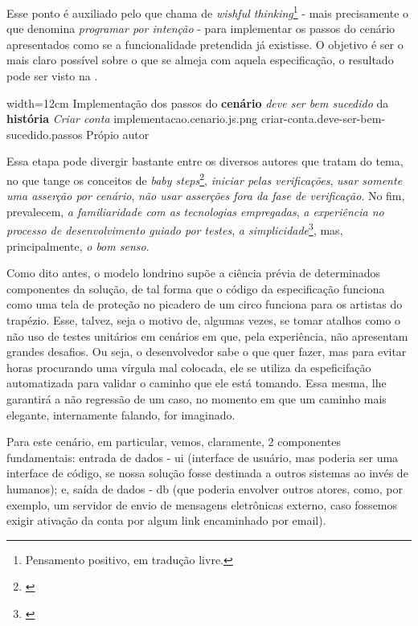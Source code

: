   Esse ponto é auxiliado pelo que  chama de \emph{wishful thinking}\footnote{Pensamento positivo, em tradução livre.} - mais precisamente o que  denomina \emph{programar por intenção} - para implementar os passos do cenário apresentados como se a funcionalidade pretendida já existisse. O objetivo é ser o mais claro possível sobre o que se almeja com aquela especificação, o resultado pode ser visto na .

  \imagem
    {width=12cm}
    {Implementação dos passos do \textbf{cenário} \emph{deve ser bem sucedido} da \textbf{história} \emph{Criar conta}}
    {implementacao.cenario.js.png}
    {criar-conta.deve-ser-bem-sucedido.passos}
    {Própio autor}

  Essa etapa pode divergir bastante entre os diversos autores que tratam do tema, no que tange os conceitos de \emph{baby steps}\footnote{\cite[pág. 1]{Aniche2011}}, \emph{iniciar pelas verificações}, \emph{usar somente uma asserção por cenário}, \emph{não usar asserções fora da fase de verificação}. No fim, prevalecem, \emph{a familiaridade com as tecnologias empregadas}, \emph{a experiência no processo de desenvolvimento guiado por testes}, \emph{a simplicidade}\footnote{\cite[pág. xii]{Beck2003}}, mas, principalmente, \emph{o bom senso}.

  Como dito antes, o modelo londrino supõe a ciência prévia de determinados componentes da solução, de tal forma que o código da especificação funciona como uma tela de proteção no picadero de um circo funciona para os artistas do trapézio. Esse, talvez, seja o motivo de, algumas vezes, se tomar atalhos como o não uso de testes unitários em cenários em que, pela experiência, não apresentam grandes desafios. Ou seja, o desenvolvedor sabe o que quer fazer, mas para evitar horas procurando uma vírgula mal colocada, ele se utiliza da espeficifação automatizada para validar o caminho que ele está tomando. Essa mesma, lhe garantirá a não regressão de um caso, no momento em que um caminho mais elegante, internamente falando, for imaginado.

  Para este cenário, em particular, vemos, claramente, 2 componentes fundamentais: entrada de dados - ui (interface de usuário, mas poderia ser uma interface de código, se nossa solução fosse destinada a outros sistemas ao invés de humanos); e, saída de dados - db (que poderia envolver outros atores, como, por exemplo, um servidor de envio de mensagens eletrônicas externo, caso fossemos exigir ativação da conta por algum link encaminhado por email).

